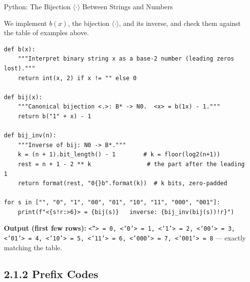 \documentclass[aspectratio=169,10pt]{beamer}
\newcommand{\bij}[1]{\langle #1\rangle}
\begin{document}
\begin{frame}[fragile]{Python: The Bijection $\bij{\cdot}$ Between Strings and Numbers}

We implement $b(x)$, the bijection $\bij{\cdot}$, and its inverse, and
check them against the table of examples above.

\begin{lstlisting}
def b(x):
    """Interpret binary string x as a base-2 number (leading zeros lost)."""
    return int(x, 2) if x != "" else 0

def bij(x):
    """Canonical bijection <.>: B* -> N0.  <x> = b(1x) - 1."""
    return b("1" + x) - 1

def bij_inv(n):
    """Inverse of bij: N0 -> B*."""
    k = (n + 1).bit_length() - 1        # k = floor(log2(n+1))
    rest = n + 1 - 2 ** k                # the part after the leading 1
    return format(rest, "0{}b".format(k))  # k bits, zero-padded

for s in ["", "0", "1", "00", "01", "10", "11", "000", "001"]:
    print(f"<{s!r:>6}> = {bij(s)}   inverse: {bij_inv(bij(s))!r}")
\end{lstlisting}

\textbf{Output (first few rows):}
\texttt{<''> = 0, <'0'> = 1, <'1'> = 2, <'00'> = 3, <'01'> = 4, <'10'> = 5,
<'11'> = 6, <'000'> = 7, <'001'> = 8} --- exactly matching the table.
\end{frame}

\subsection{2.1.2 Prefix Codes}
\end{document}
